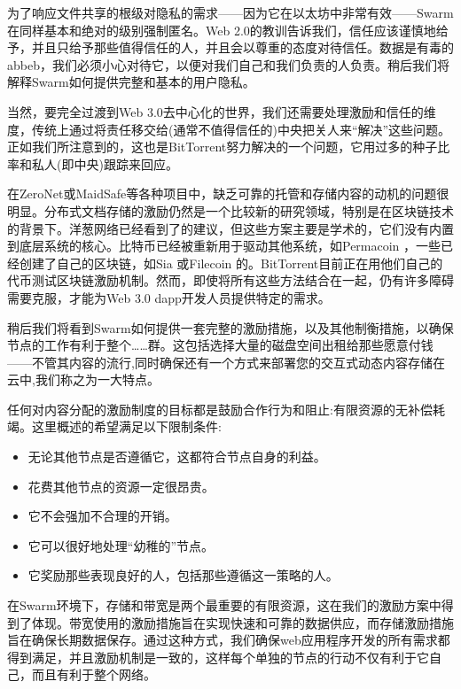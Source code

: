 为了响应文件共享的根级对隐私的需求——因为它在以太坊中非常有效——Swarm在同样基本和绝对的级别强制匿名。Web 2.0的教训告诉我们，信任应该谨慎地给予，并且只给予那些值得信任的人，并且会以尊重的态度对待信任。数据是有毒的abbeb，我们必须小心对待它，以便对我们自己和我们负责的人负责。稍后我们将解释Swarm如何提供完整和基本的用户隐私。

当然，要完全过渡到Web 3.0去中心化的世界，我们还需要处理激励和信任的维度，传统上通过将责任移交给(通常不值得信任的)中央把关人来“解决”这些问题。正如我们所注意到的，这也是BitTorrent努力解决的一个问题，它用过多的种子比率和私人(即中央)跟踪来回应。

在ZeroNet或MaidSafe等各种项目中，缺乏可靠的托管和存储内容的动机的问题很明显。分布式文档存储的激励仍然是一个比较新的研究领域，特别是在区块链技术的背景下。洋葱网络已经看到了\cite{jansen2014onions,ghoshetal2014tor}的建议，但这些方案主要是学术的，它们没有内置到底层系统的核心。比特币已经被重新用于驱动其他系统，如Permacoin \cite{miller2014permacoin}，一些已经创建了自己的区块链，如Sia \cite{vorick2014sia}或Filecoin \cite{filecoin2014}的。BitTorrent目前正在用他们自己的代币\cite{tron2018,bittorrent2019}测试区块链激励机制。然而，即使将所有这些方法结合在一起，仍有许多障碍需要克服，才能为Web 3.0 dapp开发人员提供特定的需求。

稍后我们将看到Swarm如何提供一套完整的激励措施，以及其他制衡措施，以确保节点的工作有利于整个……群。这包括选择大量的磁盘空间出租给那些愿意付钱——不管其内容的流行,同时确保还有一个方式来部署您的交互式动态内容存储在云中,我们称之为一大特点。

任何对内容分配的激励制度的目标都是鼓励合作行为和阻止:有限资源的无补偿耗竭。这里概述的希望满足以下限制条件:

\begin{itemize}
    \item 无论其他节点是否遵循它，这都符合节点自身的利益。
    \item 花费其他节点的资源一定很昂贵。
    \item 它不会强加不合理的开销。
    \item 它可以很好地处理“幼稚的”节点。
    \item 它奖励那些表现良好的人，包括那些遵循这一策略的人。
\end{itemize}

在Swarm环境下，存储和带宽是两个最重要的有限资源，这在我们的激励方案中得到了体现。带宽使用的激励措施旨在实现快速和可靠的数据供应，而存储激励措施旨在确保长期数据保存。通过这种方式，我们确保web应用程序开发的所有需求都得到满足，并且激励机制是一致的，这样每个单独的节点的行动不仅有利于它自己，而且有利于整个网络。 

